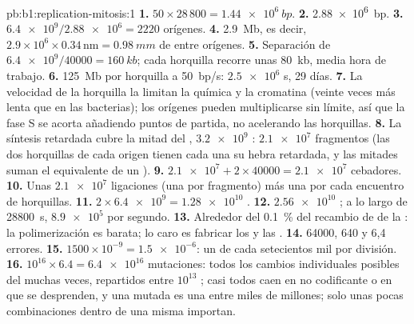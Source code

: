 \begin{solution}{pb:b1:replication-mitosis:1}
\textbf{1.} $50\times 28\,800 = \qty{1.44e6}{bp}$.
\textbf{2.} \qty{2.88e6}{bp}.
\textbf{3.} $\num{6.4e9}/\num{2.88e6} = 2220$ orígenes.
\textbf{4.} \qty{2.9}{Mb}, es decir, $2.9\times 10^6\times 0.34\,\mathrm{nm} =
\qty{0.98}{mm}$ de  entre orígenes.
\textbf{5.} Separación de $\num{6.4e9}/\num{40000} = \qty{160}{kb}$; cada
horquilla recorre unas \qty{80}{kb}, media hora de trabajo.
\textbf{6.} \qty{125}{Mb} por horquilla a \qty{50}{bp/s}: $\num{2.5e6}$ s,
29 días.
\textbf{7.} La velocidad de la horquilla la limitan la química y la
cromatina (veinte veces más lenta que en las bacterias); los orígenes pueden
multiplicarse sin límite, así que la fase S se acorta añadiendo puntos de
partida, no acelerando las horquillas.
\textbf{8.} La síntesis retardada cubre la mitad del , $\num{3.2e9}$
: $\num{2.1e7}$ fragmentos (las dos horquillas de cada origen
tienen cada una su hebra retardada, y las mitades suman el equivalente de un
).
\textbf{9.} $\num{2.1e7} + 2\times\num{40000} = \num{2.1e7}$ cebadores.
\textbf{10.} Unas $\num{2.1e7}$ ligaciones (una por fragmento) más una por
cada encuentro de horquillas.
\textbf{11.} $2\times\num{6.4e9} = \num{1.28e10}$ .
\textbf{12.} $\num{2.56e10}$ ; a lo largo de \qty{28800}{s},
$\num{8.9e5}$ por segundo.
\textbf{13.} Alrededor del \qty{0.1}{\%} del recambio de  de la :
la polimerización es barata; lo caro es fabricar los  y las
.
\textbf{14.} \num{64000}, 640 y 6,4 errores.
\textbf{15.} $1500\times 10^{-9} = \num{1.5e-6}$: un  de cada
setecientos mil por división.
\textbf{16.} $10^{16}\times 6.4 = \num{6.4e16}$ mutaciones: todos los
cambios individuales posibles del  muchas veces, repartidos entre
$10^{13}$ ; casi todos caen en  no codificante o en  que se
desprenden, y una  mutada es una entre miles de millones; solo unas
pocas combinaciones dentro de una misma  importan.

\end{solution}
